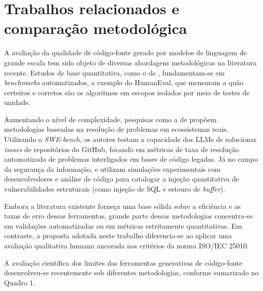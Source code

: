 \section{Trabalhos relacionados e comparação metodológica}

A avaliação da qualidade de código-fonte gerado por modelos de linguagem de grande escala tem sido objeto de diversas abordagens metodológicas na literatura recente. Estudos de base quantitativa, como o de , fundamentam-se em \textit{benchmarks} automatizados, a exemplo do HumanEval, que mensuram a quão certeiros e corretos são os algoritmos em escopos isolados por meio de testes de unidade. 

Aumentando o nível de complexidade, pesquisas como a de  propõem metodologias baseadas na resolução de problemas em ecossistemas reais. Utilizando o \textit{SWE-bench}, os autores testam a capacidade dos LLMs de solucionar \textit{issues} de repositórios do GitHub, focando em métricas de taxa de resolução automatizada de problemas interligados em bases de código legadas. Já no campo da segurança da informação,  e  utilizam simulações experimentais com desenvolvedores e análise de código para catalogar a injeção quantitativa de vulnerabilidades estruturais (como injeção de SQL e estouro de \textit{buffer}).

Embora a literatura existente forneça uma base sólida sobre a eficiência e as taxas de erro dessas ferramentas, grande parte dessas metodologias concentra-se em validações automatizadas ou em métricas estritamente quantitativas. Em contraste, a proposta adotada neste trabalho diferencia-se ao aplicar uma avaliação qualitativa humana ancorada nos critérios da norma ISO/IEC 25010. 


A avaliação científica dos limites das ferramentas generativas de código-fonte desenvolveu-se recentemente sob diferentes metodologias, conforme sumarizado no Quadro 1.

